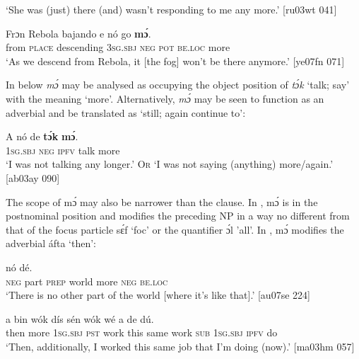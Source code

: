 \glt ‘She was (just) there (and) wasn’t responding to me any more.’ [ru03wt 041]
\z


\ea%
    \label{ex:key:869}
    \gll Frɔn    Rebola  bajando    e    nó  go      \textbf{mɔ́}.\\
from  \textsc{place}  descending  \textsc{3sg.sbj}  \textsc{neg}  \textsc{pot}  \textsc{be.loc}  more\\

\glt ‘As we descend from Rebola, it [the fog] won’t be there anymore.’ [ye07fn 071]
\z

In  below \textit{mɔ́} may be analysed as occupying the object position of \textit{tɔ́k} ‘talk; say’ with the meaning ‘more’. Alternatively, \textit{mɔ́} may be seen to function as an adverbial and be translated as ‘still; again continue to’:


\ea%
    \label{ex:key:870}
    \gll A    nó  de  \textbf{tɔ́k}  \textbf{mɔ́}.\\
\textsc{1sg.sbj}  \textsc{neg}  \textsc{ipfv}  talk  more\\

\glt ‘I was not talking any longer.’ O\textsc{r} ‘I was not saying (anything) more/again.’ [ab03ay 090]
\z

The scope of mɔ́ may also be narrower than the clause. In , mɔ́ is in the postnominal position and modifies the preceding NP in a way no different from that of the focus particle sɛ́f ‘foc’ or the quantifier{\fff} ɔ́l ’all’. In , mɔ́ modifies the adverbial áfta ‘then’: 


\ea%
    \label{ex:key:871}
    \gll {}              nó  dé.\\
\textsc{neg}  part  \textsc{prep}  world  more  \textsc{neg}  \textsc{be.loc}\\

\glt ‘There is no other part of the world [where it’s like that].’ [au07se 224]
\z


\ea%
    \label{ex:key:872}
    \gll {}   a    bin  wók    dís  sén    wók 
wé  a    de  dú. \\
then  more  \textsc{1sg.sbj}  \textsc{pst}  work  this  same  work  
\textsc{sub}  \textsc{1sg.sbj}  \textsc{ipfv}  do\\

\glt ‘Then, additionally, I worked this same job that I’m doing (now).’ [ma03hm 057]
\z

